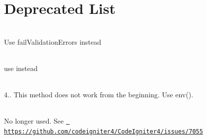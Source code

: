 \chapter{Deprecated List}
\hypertarget{deprecated}{}\label{deprecated}

\begin{DoxyRefList}
\item[Member \doxylink{namespace_code_igniter_1_1_a_p_i_a6e5fa09d5480ba924985fbaa04b4b8a6}{Code\+Igniter\+::API\+::fail\+Validation\+Error} (string \$description=\textquotesingle{}Bad \doxylink{class_code_igniter_1_1_h_t_t_p_1_1_request}{Request}\textquotesingle{}, ?string \$code=null, string \$message=\textquotesingle{}\textquotesingle{})]\hfill \\
\label{deprecated__deprecated000007}%
%
Use fail\+Validation\+Errors instead  
\item[Member \doxylink{namespace_code_igniter_1_1_c_l_i_ad0c71d60485756a6adfacab49da88dae}{Code\+Igniter\+::CLI\+::execute} (array \$params)]\hfill \\
\label{deprecated__deprecated000015}%
%
use  instead  
\item[Member \doxylink{namespace_code_igniter_1_1_h_t_t_p_ad82e2dea2178aac0bb621fd8179cbe13}{Code\+Igniter\+::HTTP\+::get\+Env} (\$index=null, \$filter=null, \$flags=null)]\hfill \\
\label{deprecated__deprecated000080}%
%
4.. This method does not work from the beginning. Use {\ttfamily env()}.  
\item[Member \doxylink{class_code_igniter_1_1_autoloader_1_1_autoloader_ac7012bfded5a95018cc2f13f80558a19}{Code\+Igniter\textbackslash{}Autoloader\textbackslash{}Autoloader\+::sanitize\+Filename} (string \$filename)]\hfill \\
\label{deprecated__deprecated000008}%
%
No longer used. See \href{https://github.com/codeigniter4/CodeIgniter4/issues/7055}{\texttt{ https\+://github.\+com/codeigniter4/\+Code\+Igniter4/issues/7055}}  
\item[Member \doxylink{class_code_igniter_1_1_cache_1_1_handlers_1_1_base_handler_aab78c36dc9172889a23edc4deecd3ec4}{Code\+Igniter\textbackslash{}Cache\textbackslash{}Handlers\textbackslash{}Base\+Handler\+::RESERVED\+\_\+\+CHARACTERS} ]\hfill \\

\end{DoxyRefList}
